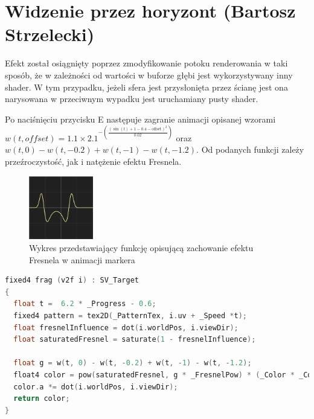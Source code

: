 \section{Widzenie przez horyzont (Bartosz Strzelecki)}
Efekt został osiągnięty poprzez zmodyfikowanie potoku renderowania w taki sposób, że w zależności od wartości w buforze głębi jest wykorzystywany inny shader.
W tym przypadku, jeżeli sfera jest przysłonięta przez ścianę jest ona narysowana w przeciwnym wypadku jest uruchamiany pusty shader.

Po naciśnięciu przycisku E następuje zagranie animacji opisanej wzorami $ w(t, offset) = 1.1 \times 2.1^{-\left(\frac{{\left(\sin(t) + 1 - 0.4 - \text{{offset}}\right)^2}}{{0.02}}\right)} $
oraz $ w(t, 0) - w(t, -0.2) + w(t, -1) - w(t, -1.2) $. Od podanych funkcji zależy przeźroczystość, jak i natężenie efektu Fresnela. 

\begin{figure}[h]
    \centering
    \includegraphics[width=0.25\textwidth]{images/g}
    \caption{Wykres przedstawiający funkcję opisującą zachowanie efektu Fresnela w animacji markera}
\end{figure}



\begin{lstlisting}[language=C++, caption=Fragment shadera odpowiedzialny za animację]
fixed4 frag (v2f i) : SV_Target
{
  float t =  6.2 * _Progress - 0.6;
  fixed4 pattern = tex2D(_PatternTex, i.uv + _Speed *t);
  float fresnelInfluence = dot(i.worldPos, i.viewDir);
  float saturatedFresnel = saturate(1 - fresnelInfluence);

  float g = w(t, 0) - w(t, -0.2) + w(t, -1) - w(t, -1.2);
  float4 color = pow(saturatedFresnel, g * _FresnelPow) * (_Color * _ColorIntensity) * pattern;
  color.a *= dot(i.worldPos, i.viewDir);
  return color;
}
\end{lstlisting}
